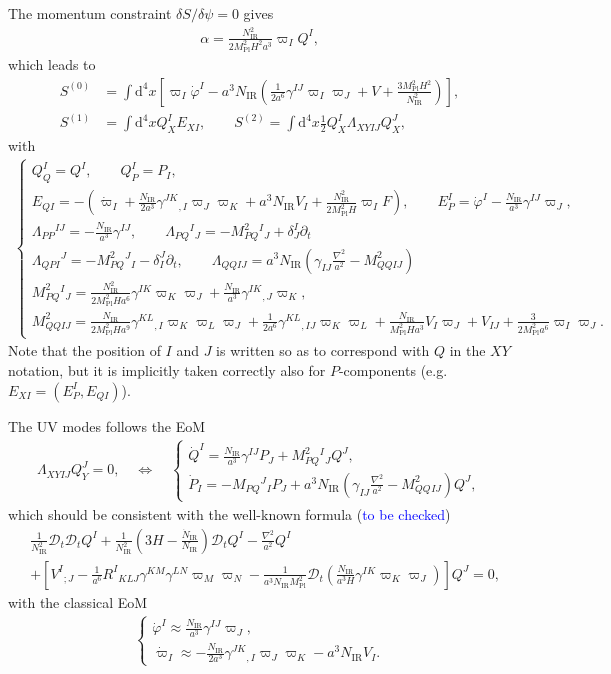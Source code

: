 \documentclass[aps, prd
, preprint
, nofootinbib 
]{revtex4-1}
\newcommand{\dd}{\mathrm{d}}
\newcommand{\Mpl}{M_\text{Pl}}
\newcommand{\IR}{\text{IR}}
\newcommand{\dps}{\displaystyle}
\newcommand{\calD}{\mathcal{D}}
\newcommand{\bae}[1]{\begin{align} #1 \end{align}}
\newcommand{\bce}[1]{\begin{cases} #1 \end{cases}}
\newcommand{\Blue}[1]{\textcolor{blue}{\sffamily #1}}
\begin{document}
The momentum constraint $\delta S/\delta\psi=0$ gives
\bae{
	\alpha=\frac{N_\IR^2}{2\Mpl^2H^2a^3}\varpi_IQ^I,
}
which leads to
\bae{
	S^{(0)}&=\int\dd^4x\left[\varpi_I\dot{\varphi}^I-a^3N_\IR\left(\frac{1}{2a^6}\gamma^{IJ}\varpi_I\varpi_J+V+\frac{3\Mpl^2H^2}{N_\IR^2}\right)\right], \\
	S^{(1)}&=\int\dd^4xQ_X^IE_{XI}, \quad\quad S^{(2)}=\int\dd^4x\frac{1}{2}Q_X^I\Lambda_{XYIJ}Q_X^J,
}
with
\bae{
	\bce{
		\dps
		Q_Q^I=Q^I, \quad\quad Q_P^I=P_I, \\[10pt]
		\dps
		E_{QI}=-\left(\dot{\varpi}_I+\frac{N_\IR}{2a^3}\gamma^{JK}{}_{,I}\varpi_J\varpi_K+a^3N_\IR V_I+\frac{N_\IR^2}{2\Mpl^2H}\varpi_IF\right),
		\quad\quad
		E_P^I=\dot{\varphi}^I-\frac{N_\IR}{a^3}\gamma^{IJ}\varpi_{J}, \\[10pt]
		\dps
		\Lambda_{PP}{}^{IJ}=-\frac{N_\IR}{a^3}\gamma^{IJ}, \quad\quad \Lambda_{PQ}{}^I{}_J=-M_{PQ}^2{}^I{}_J+\delta^I_J\partial_t \\[10pt]
		\dps
		\Lambda_{QPI}{}^J=-M_{PQ}^2{}^J{}_I-\delta^J_I\partial_t, \quad\quad 
		\Lambda_{QQIJ}=a^3N_\IR\left(\gamma_{IJ}\frac{\nabla^2}{a^2}-M_{QQIJ}^2\right)\\[10pt]
		\dps
		M_{PQ}^2{}^I{}_J=\frac{N_\IR^2}{2\Mpl^2Ha^6}\gamma^{IK}\varpi_K\varpi_J+\frac{N_\IR}{a^3}\gamma^{IK}{}_{,J}\varpi_K, \\[10pt]
		\dps
		M_{QQIJ}^2=\frac{N_\IR}{2\Mpl^2Ha^9}\gamma^{KL}{}_{,I}\varpi_K\varpi_L\varpi_J
		+\frac{1}{2a^6}\gamma^{KL}{}_{,IJ}\varpi_K\varpi_L+\frac{N_\IR}{\Mpl^2Ha^3}V_I\varpi_J+V_{IJ}+\frac{3}{2\Mpl^2a^6}\varpi_I\varpi_J.
	}
}
Note that the position of $I$ and $J$ is written so as to correspond with $Q$ in the $XY$ notation,
but it is implicitly taken correctly also for $P$-components (e.g. $E_{XI}=(E_P^I,E_{QI})$).

The UV modes follows the EoM
\bae{
	\Lambda_{XYIJ}Q_Y^J=0, \quad\Leftrightarrow\quad \bce{
		\dps
		\dot{Q}^I=\frac{N_\IR}{a^3}\gamma^{IJ}P_J+M_{PQ}^2{}^I{}_JQ^J, \\[10pt]
		\dps
		\dot{P}_I=-M_{PQ}{}^J{}_IP_J+a^3N_\IR\left(\gamma_{IJ}\frac{\nabla^2}{a^2}-M_{QQ}^2{}_{IJ}\right)Q^J,
	}
}
which should be consistent with the well-known formula (\Blue{to be checked})
\bae{
	&\frac{1}{N_\IR^2}\calD_t\calD_tQ^I+\frac{1}{N_\IR^2}\left(3H-\frac{\dot{N}_\IR}{N_\IR}\right)\calD_tQ^I
	-\frac{\nabla^2}{a^2}Q^I \nonumber \\
	&+\left[V^I{}_{;J}-\frac{1}{a^6}R^I{}_{KLJ}\gamma^{KM}\gamma^{LN}\varpi_M\varpi_N
	-\frac{1}{a^3N_\IR\Mpl^2}\calD_t\left(\frac{N_\IR}{a^3H}\gamma^{IK}\varpi_K\varpi_J\right)\right]Q^J=0,
}
with the classical EoM
\bae{
	\bce{
		\dps
		\dot{\varphi}^I\approx\frac{N_\IR}{a^3}\gamma^{IJ}\varpi_{J}, \\[10pt]
		\dps
		\dot{\varpi}_I\approx-\frac{N_\IR}{2a^3}\gamma^{JK}{}_{,I}\varpi_J\varpi_K-a^3N_\IR V_I.
	}
}
\end{document}
